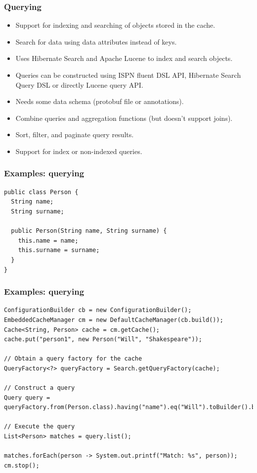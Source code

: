 \documentclass[10pt,utf8]{beamer}
\begin{document}
\begin{frame}
	\frametitle{Querying}
	\begin{itemize}
		\item Support for indexing and searching of objects stored in the cache.
		\pause
		\item Search for data using data attributes instead of keys.
		\pause
		\item Uses Hibernate Search and Apache Lucene to index and search objects.
		\pause
		\item Queries can be constructed using ISPN fluent DSL API, Hibernate Search Query DSL or directly Lucene query API.
		\pause
		\item Needs some data schema (protobuf file or annotations).
		\pause
		\item Combine queries and aggregation functions (but doesn't support joins).
		\pause
		\item Sort, filter, and paginate query results.
		\pause
		\item Support for index or non-indexed queries.
	\end{itemize}
\end{frame}

\begin{frame}[fragile]
	\frametitle{Examples: querying}
	\begin{lstlisting}[style=Java]
public class Person {
  String name;
  String surname;
	
  public Person(String name, String surname) {
    this.name = name;
    this.surname = surname;
  }
}
	\end{lstlisting}
\end{frame}

\begin{frame}[fragile]
	\frametitle{Examples: querying}
		\begin{lstlisting}[style=Java]
ConfigurationBuilder cb = new ConfigurationBuilder();
EmbeddedCacheManager cm = new DefaultCacheManager(cb.build());
Cache<String, Person> cache = cm.getCache();
cache.put("person1", new Person("Will", "Shakespeare"));

// Obtain a query factory for the cache
QueryFactory<?> queryFactory = Search.getQueryFactory(cache);

// Construct a query
Query query = queryFactory.from(Person.class).having("name").eq("Will").toBuilder().build();
      
// Execute the query
List<Person> matches = query.list();

matches.forEach(person -> System.out.printf("Match: %s", person));
cm.stop();
	\end{lstlisting}
\end{frame}
\end{document}
